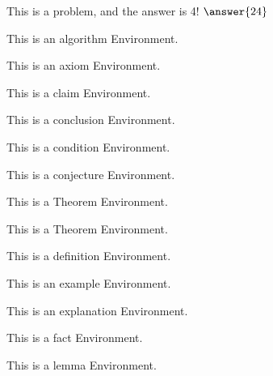 \documentclass{ximera}
\begin{document}
        \begin{exploration}
            This is a problem, and the answer is 4! $\answer{24}$
        \end{exploration}
        \begin{algorithm}
            This is an algorithm Environment.
        \end{algorithm}%
        \begin{axiom}
            This is an axiom Environment.
        \end{axiom}%
        \begin{claim}
            This is a claim Environment.
        \end{claim}%
        \begin{conclusion}
            This is a conclusion Environment.
        \end{conclusion}%
        \begin{condition}
            This is a condition Environment.
        \end{condition}%
        \begin{conjecture}
            This is a conjecture Environment.
        \end{conjecture}%
        \begin{corollary}
            This is a Theorem Environment.
        \end{corollary}%
        \begin{criterion}
            This is a Theorem Environment.
        \end{criterion}%
        \begin{definition}
            This is a definition Environment.
        \end{definition}%
        \begin{example}
            This is an example Environment.
        \end{example}%
        \begin{explanation}
            This is an explanation Environment.
        \end{explanation}%
        \begin{fact}
            This is a fact Environment.
        \end{fact}%
        \begin{lemma}
            This is a lemma Environment.
        \end{lemma}%
\end{document}
